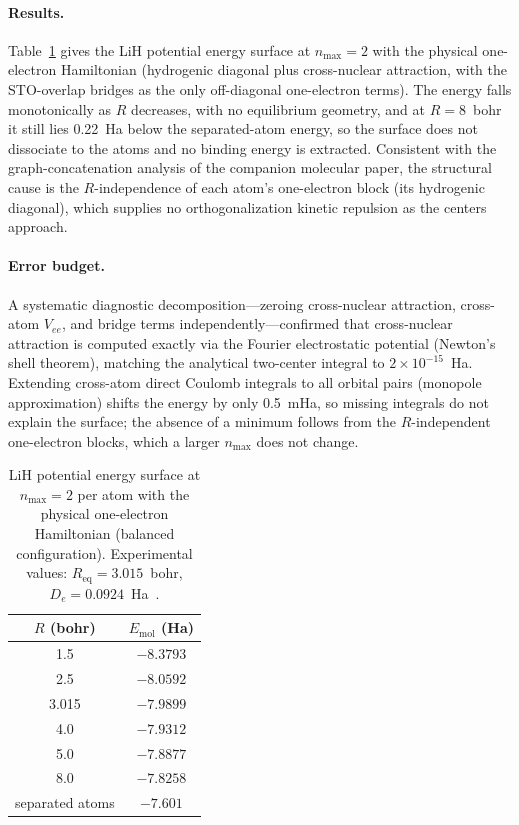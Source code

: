 \documentclass[aps,pra,twocolumn,superscriptaddress,longbibliography,floatfix]{revtex4-2}
\begin{document}
\paragraph{Results.}
Table~\ref{tab:lih} gives the LiH potential energy surface at
$n_{\max}=2$ with the physical one-electron Hamiltonian (hydrogenic
diagonal plus cross-nuclear attraction, with the STO-overlap bridges as
the only off-diagonal one-electron terms).  The energy falls
monotonically as $R$ decreases, with no equilibrium geometry, and at
$R = 8$~bohr it still lies 0.22~Ha below the separated-atom energy, so
the surface does not dissociate to the atoms and no binding energy is
extracted.  Consistent with the graph-concatenation analysis of the
companion molecular paper, the structural cause is the
$R$-independence of each atom's one-electron block (its hydrogenic
diagonal), which supplies no orthogonalization kinetic repulsion as the
centers approach.

\paragraph{Error budget.}
A systematic diagnostic decomposition---zeroing cross-nuclear attraction,
cross-atom $V_{ee}$, and bridge terms independently---confirmed that
cross-nuclear attraction is computed exactly via the Fourier electrostatic
potential (Newton's shell theorem), matching the analytical two-center
integral to $2 \times 10^{-15}$~Ha. Extending cross-atom direct Coulomb
integrals to all orbital pairs (monopole approximation) shifts
the energy by only 0.5~mHa, so missing integrals do not explain the
surface; the absence of a minimum follows from the $R$-independent
one-electron blocks, which a larger $n_{\max}$ does not change.

\begin{table}[h]
\caption{\label{tab:lih}%
LiH potential energy surface at $n_{\max}=2$ per atom with the
physical one-electron Hamiltonian (balanced configuration).
Experimental values: $R_{\text{eq}} = 3.015$~bohr,
$D_e = 0.0924$~Ha~\cite{Huber1979}.}
\begin{ruledtabular}
\begin{tabular}{cc}
$R$ (bohr) & $E_{\text{mol}}$ (Ha) \\
\hline
1.5   & $-8.3793$ \\
2.5   & $-8.0592$ \\
3.015 & $-7.9899$ \\
4.0   & $-7.9312$ \\
5.0   & $-7.8877$ \\
8.0   & $-7.8258$ \\
\hline
separated atoms & $-7.601$ \\
\end{tabular}
\end{ruledtabular}
\end{table}
\end{document}
